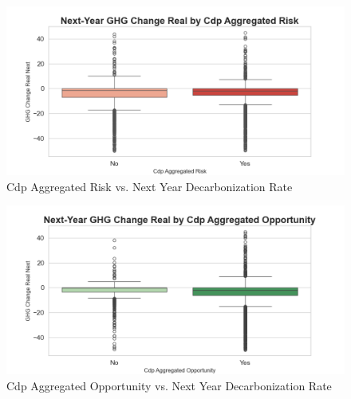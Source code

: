 \begin{figure}[H]
\centering
  \includegraphics[width=\textwidth]{figures/ghg_change_real_next_by_cdp_aggregated_risk.png}
\caption{Cdp Aggregated Risk vs. Next Year Decarbonization Rate}
\label{fig:ghg_change_real_next_by_cdp_aggregated_risk}
\end{figure}

\begin{figure}[H]
\centering
  \includegraphics[width=\textwidth]{figures/ghg_change_real_next_by_cdp_aggregated_opportunity.png}
\caption{Cdp Aggregated Opportunity vs. Next Year Decarbonization Rate}
\label{fig:ghg_change_real_next_by_cdp_aggregated_opportunity}
\end{figure}


